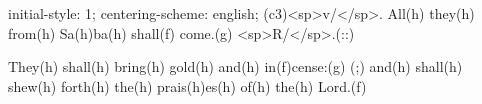 initial-style: 1;
centering-scheme: english;
(c3)<sp>v/</sp>. All(h) they(h) from(h) Sa(h)ba(h) shall(f) come.(g) <sp>R/</sp>.(::)

They(h) shall(h) bring(h) gold(h) and(h) in(f)cense:(g) (;) and(h) shall(h) shew(h) forth(h) the(h) prais(h)es(h) of(h) the(h) Lord.(f)
